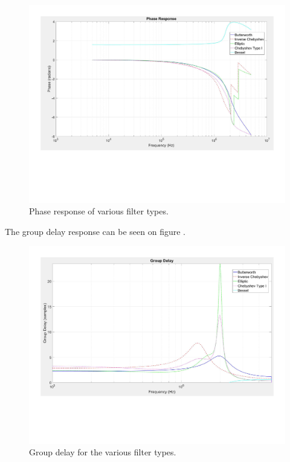 \begin{figure}[H]
    \centering
    \includegraphics[clip, trim=0 150 0 0, width=1\textwidth]{Appendix/Figures/A_FILT_PHASE.pdf}
    \caption{Phase response of various filter types.}
    \label{fig:A_FILT_PHASE}
\end{figure}

The group delay response can be seen on figure .

\begin{figure}[H]
    \centering
    \includegraphics[clip, trim=0 150 0 0, width=1\textwidth]{Appendix/Figures/A_FILT_GROUP.pdf}
    \caption{Group delay for the various filter types.}
    \label{fig:A_FILT_GROUP}
\end{figure}

